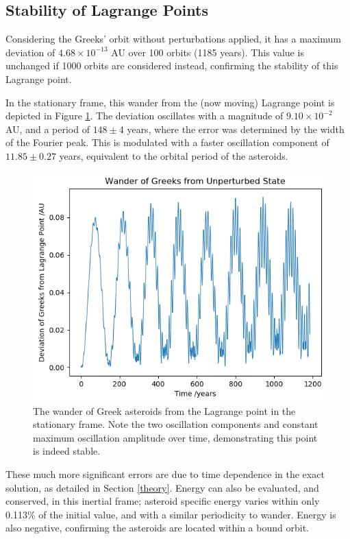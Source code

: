 \documentclass[11pt, a4paper,twocolumn]{article} %
\begin{document}
\subsection{Stability of Lagrange Points}
Considering the Greeks' orbit without perturbations applied, it has a maximum deviation of $4.68 \times 10^{-13}$ AU over 100 orbits (1185 years). This value is unchanged if 1000 orbits are considered instead, confirming the stability of this Lagrange point.

In the stationary frame, this wander from the (now moving) Lagrange point is depicted in Figure \ref{fig:greeksdeviationstationaryframe}. The deviation oscillates with a magnitude of $9.10 \times 10^{-2}$ AU, and a period of $148 \pm 4$ years, where the error was determined by the width of the Fourier peak. This is modulated with a faster oscillation component of $11.85 \pm 0.27$ years, equivalent to the orbital period of the asteroids.

\begin{figure}
	\centering
	\includegraphics[width=\linewidth]{Figures/greeks_deviation_stationary_frame}
	\caption{The wander of Greek asteroids from the Lagrange point in the stationary frame. Note the two oscillation components and constant maximum oscillation amplitude over time, demonstrating this point is indeed stable.}
	\label{fig:greeksdeviationstationaryframe}
\end{figure}

These much more significant errors are due to time dependence in the exact solution, as detailed in Section \ref{theory}. Energy can also be evaluated, and conserved, in this inertial frame; asteroid specific energy varies within only 0.113\% of the initial value, and with a similar periodicity to wander. Energy is also negative, confirming the asteroids are located within a bound orbit.
\end{document}
